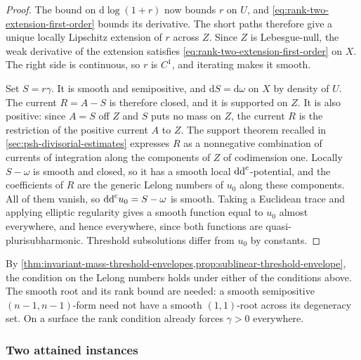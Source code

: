 \begin{proof}
The bound on $\mathrm d\log(1+r)$ now bounds $r$ on $U$, and \eqref{eq:rank-two-extension-first-order} bounds its derivative. The short paths therefore give a unique locally Lipschitz extension of $r$ across $Z$. Since $Z$ is Lebesgue-null, the weak derivative of the extension satisfies \eqref{eq:rank-two-extension-first-order} on $X$. The right side is continuous, so $r$ is $C^1$, and iterating makes it smooth.

Set $S=r\gamma$. It is smooth and semipositive, and $\mathrm dS=\mathrm d\omega$ on $X$ by density of $U$. The current $R=A-S$ is therefore closed, and it is supported on $Z$. It is also positive: since $A=S$ off $Z$ and $S$ puts no mass on $Z$, the current $R$ is the restriction of the positive current $A$ to $Z$. The support theorem recalled in \cref{sec:psh-divisorial-estimates} expresses $R$ as a nonnegative combination of currents of integration along the components of $Z$ of codimension one. Locally $S-\omega$ is smooth and closed, so it has a smooth local $\mathrm{dd}^{\mathrm{c}}$-potential, and the coefficients of $R$ are the generic Lelong numbers of $u_0$ along these components. All of them vanish, so $\mathrm{dd}^{\mathrm{c}} u_0=S-\omega$ is smooth. Taking a Euclidean trace and applying elliptic regularity gives a smooth function equal to $u_0$ almost everywhere, and hence everywhere, since both functions are quasi-plurisubharmonic. Threshold subsolutions differ from $u_0$ by constants.
\end{proof}

By \cref{thm:invariant-mass-threshold-envelopes,prop:sublinear-threshold-envelope}, the condition on the Lelong numbers holds under either of the conditions above. The smooth root and its rank bound are needed: a smooth semipositive $(n-1,n-1)$-form need not have a smooth $(1,1)$-root across its degeneracy set. On a surface the rank condition already forces $\gamma>0$ everywhere.

\subsubsection{Two attained instances}

